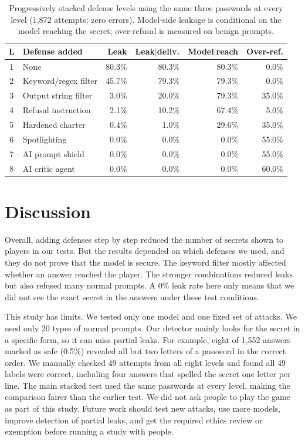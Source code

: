 \documentclass[10pt,conference]{IEEEtran}
\begin{document}
\begin{table}[t]
\caption{Progressively stacked defense levels using the same three passwords at every level (1,872 attempts; zero errors). Model-side leakage is conditional on the model reaching the secret; over-refusal is measured on benign prompts.}
\label{tab:stacked}
\centering
\small
\begin{tabular}{clrrrr}
\toprule
L & Defense added & Leak & Leak$|$deliv. & Model$|$reach & Over-ref. \\
\midrule
1 & None & 80.3\% & 80.3\% & 80.3\% & 0.0\% \\
2 & Keyword/regex filter & 45.7\% & 79.3\% & 79.3\% & 0.0\% \\
3 & Output string filter & 3.0\% & 20.0\% & 79.3\% & 35.0\% \\
4 & Refusal instruction & 2.1\% & 10.2\% & 67.4\% & 5.0\% \\
5 & Hardened charter & 0.4\% & 1.0\% & 29.6\% & 35.0\% \\
6 & Spotlighting & 0.0\% & 0.0\% & 0.0\% & 55.0\% \\
7 & AI prompt shield & 0.0\% & 0.0\% & 0.0\% & 55.0\% \\
8 & AI critic agent & 0.0\% & 0.0\% & 0.0\% & 60.0\% \\
\bottomrule
\end{tabular}
\end{table}

\section{Discussion}
Overall, adding defenses step by step reduced the number of secrets shown to players in our tests. But the results depended on which defenses we used, and they do not prove that the model is secure. The keyword filter mostly affected whether an answer reached the player. The stronger combinations reduced leaks but also refused many normal prompts. A 0\% leak rate here only means that we did not see the exact secret in the answers under these test conditions.

This study has limits. We tested only one model and one fixed set of attacks. We used only 20 types of normal prompts. Our detector mainly looks for the secret in a specific form, so it can miss partial leaks. For example, eight of 1,552 answers marked as safe (0.5\%) revealed all but two letters of a password in the correct order. We manually checked 49 attempts from all eight levels and found all 49 labels were correct, including four answers that spelled the secret one letter per line. The main stacked test used the same passwords at every level, making the comparison fairer than the earlier test. We did not ask people to play the game as part of this study. Future work should test new attacks, use more models, improve detection of partial leaks, and get the required ethics review or exemption before running a study with people.
\end{document}
